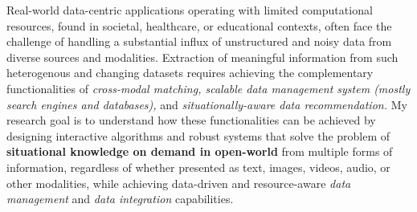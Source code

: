 
Real-world data-centric applications operating with limited computational resources, found in societal, healthcare, or educational contexts, often face the challenge of handling a substantial influx of unstructured and noisy data from diverse sources and modalities.
Extraction of meaningful information %
from such 
heterogenous and changing %
datasets requires achieving the complementary 
functionalities of 
\textit{
cross-modal matching,
scalable data management system (mostly search engines and databases),
}and \textit{situationally-aware data recommendation.}
My research goal is to understand how these
functionalities can be achieved by %
designing interactive algorithms and 
robust systems %
that solve the problem of 
\textbf{situational knowledge on demand in open-world}
from multiple forms of information, regardless of whether
presented as text, images, videos, audio, or other modalities,
while achieving data-driven and resource-aware \textit{data management} and \textit{data integration} capabilities. 